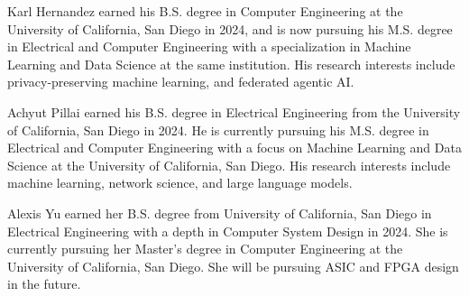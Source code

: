 \documentclass[journal]{IEEEtran}
\begin{document}
\captionsetup{font=footnotesize} %


         





\clearpage



\newpage

\begin{IEEEbiography}{Karl Hernandez} earned his B.S. degree in Computer Engineering at the University of California, San Diego in 2024, and is now pursuing his M.S. degree in Electrical and Computer Engineering with a specialization in Machine Learning and Data Science at the same institution. His research interests include privacy-preserving machine learning, and federated agentic AI.
\end{IEEEbiography}
\vspace{-1in}
\begin{IEEEbiography} {Achyut Pillai} earned his B.S. degree in Electrical Engineering from the University of California, San Diego in 2024. He is currently pursuing his M.S. degree in Electrical and Computer Engineering with a focus on Machine Learning and Data Science at the University of California, San Diego. His research interests include machine learning, network science, and large language models.
\end{IEEEbiography}
\vspace{-1in}
\begin{IEEEbiography}{Alexis Yu} earned her B.S. degree from University of California, San Diego in Electrical Engineering with a depth in Computer System Design in 2024. She is currently pursuing her Master's degree in Computer Engineering at the University of California, San Diego. She will be pursuing ASIC and FPGA design in the future. 
\end{IEEEbiography}
\end{document}
